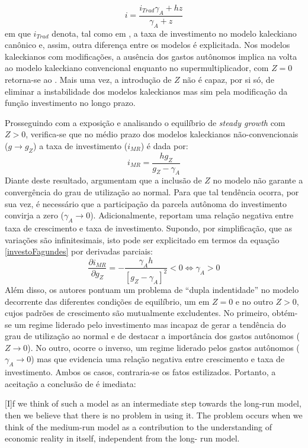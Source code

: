 $$
i = \frac{i_{Trad}\gamma_A + hz}{\gamma_A + z}
$$
em que $i_{Trad}$ denota, tal como em \textcite{fagundes_dinamica_2017}, a taxa de investimento no modelo kaleckiano canônico e, assim, outra diferença entre os modelos é explicitada. Nos modelos kaleckianos com modificações, a ausência dos gastos autônomos implica na volta ao modelo kaleckiano convencional enquanto no supermultiplicador, com $Z = 0$ retorna-se ao \textcite{harrod_essay_1939}. Mais uma vez, a introdução de $Z$ não é capaz, por si só, de eliminar a instabilidade dos modelos kaleckianos mas sim pela modificação da função investimento no longo prazo. 

Prosseguindo com a exposição e analisando o equilíbrio de \textit{steady growth} com $Z > 0$, verifica-se que no médio prazo dos modelos kaleckianos não-convencionais ($g\to g_Z$) a taxa de investimento ($i_{MR}$) é dada por:
\begin{equation}
\label{investoFagundes}
i_{MR} = \frac{hg_Z}{g_Z - \gamma_A}
\end{equation}
Diante deste resultado, \textcite{fagundes_role_2017} argumentam que a inclusão de $Z$ no modelo não garante a convergência do grau de utilização ao normal. Para que tal tendência ocorra, por sua vez, é necessário que a participação da parcela autônoma do investimento convirja a zero ($\gamma_A \to 0$). 
Adicionalmente, \textcite{fagundes_role_2017} reportam uma relação negativa entre taxa de crescimento e taxa de investimento. Supondo, por simplificação, que as variações são infinitesimais, isto pode ser explicitado em termos da equação \ref{investoFagundes} por derivadas parciais:
$$
\frac{\partial i_{MR}}{\partial g_Z} = - \frac{\gamma_A h}{[g_Z - \gamma_A]^2} < 0 \Leftrightarrow \gamma_A > 0
$$
Além disso, os autores pontuam um problema de ``dupla indentidade'' no modelo decorrente das diferentes condições de equilíbrio, um em $Z = 0$ e no outro $Z>0$, cujos padrões de crescimento são mutualmente excludentes. No primeiro, obtém-se um regime liderado pelo investimento mas incapaz de gerar a tendência do grau de utilização ao normal e de destacar a importância dos gastos autônomos ($Z\to 0$). No outro, ocorre o inverso, um regime liderado pelos gastos autônomos ($\gamma_A \to 0$) mas que evidencia uma relação negativa entre crescimento e taxa de investimento. Ambos os casos, contraria-se os fatos estilizados. Portanto, a aceitação a conclusão de \textcite[p.~13]{fagundes_role_2017} é imediata:

\begin{citacao}
	
	[I]f we think of such a model as an intermediate step towards the long-run model, then we
	believe that there is no problem in using it. The problem occurs when we think of the medium-run
	model as a contribution to the understanding of economic reality in itself, independent from the long-
	run model.
\end{citacao}

